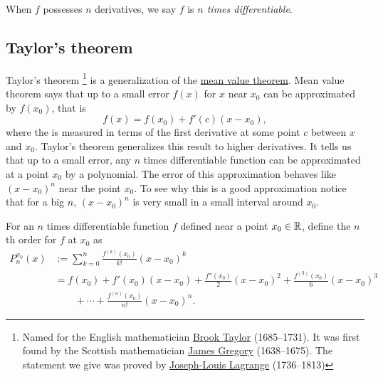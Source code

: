 When $f$ possesses $n$ derivatives, we say $f$ is
\emph{$n$ times differentiable}.

\subsection{Taylor's theorem}

Taylor's theorem%
\footnote{Named for the English mathematician
\href{https://en.wikipedia.org/wiki/Brook_Taylor}{Brook Taylor}
(1685--1731).
It was first found by
the Scottish mathematician
\href{https://en.wikipedia.org/wiki/James_Gregory_(mathematician)}{James Gregory}
(1638--1675).  The statement we give
was proved by
\href{https://en.wikipedia.org/wiki/Lagrange}{Joseph-Louis Lagrange}
(1736--1813)}
is a generalization of the \hyperref[thm:mvt]{mean value theorem}.
Mean value theorem says that up to a small error $f(x)$ for $x$ near $x_0$ can be
approximated by $f(x_0)$, that is
\begin{equation*}
f(x) = f(x_0) + f'(c)(x-x_0),
\end{equation*}
where the  is measured in terms of the first derivative
at some point $c$ between $x$ and $x_0$.
Taylor's theorem generalizes this result to higher derivatives.
It tells us that up to a small error, any $n$
times differentiable function can be approximated at a point $x_0$
by a polynomial.  The
error of this approximation behaves like ${(x-x_0)}^{n}$ near the point $x_0$.
To see why this is a good approximation notice that for a big $n$, 
${(x-x_0)}^n$ is very small in a small interval around $x_0$.

\begin{defn}
For an $n$ times differentiable function $f$ defined near a point $x_0 \in {\mathbb{R}}$, define the
$n$th order \emph{}%
for $f$ at $x_0$ as
\begin{equation*}
\begin{split}
P_n^{x_0}(x)
& :=
\sum_{k=0}^n
\frac{f^{(k)}(x_0)}{k!}{(x-x_0)}^k
\\
& =
f(x_0)
+ f'(x_0)(x-x_0)
+ \frac{f''(x_0)}{2}{(x-x_0)}^2
+ \frac{f^{(3)}(x_0)}{6}{(x-x_0)}^3
\\
& \qquad
+ \cdots
+ \frac{f^{(n)}(x_0)}{n!}{(x-x_0)}^n .
\end{split}
\end{equation*}
\end{defn}

